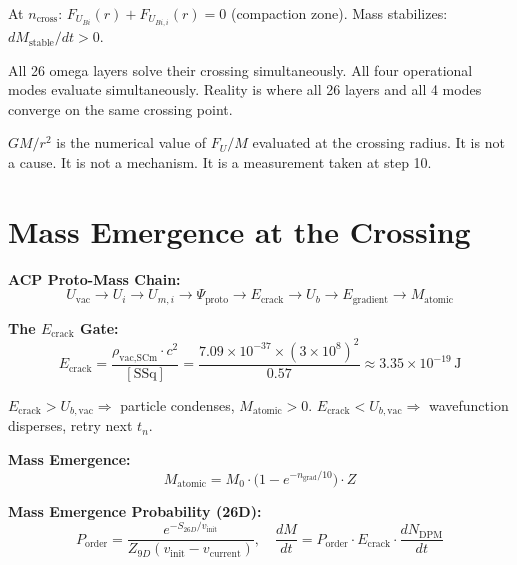 \documentclass[12pt,a4paper]{article}
\begin{document}
At $n_{\text{cross}}$: $F_{U_{Bi}}(r) + F_{U_{Bi,i}}(r) = 0$ (compaction zone).
Mass stabilizes: $dM_{\text{stable}}/dt > 0$.

All 26 omega layers solve their crossing simultaneously.
All four operational modes evaluate simultaneously.
Reality is where all 26 layers and all 4 modes converge on the same crossing point.

$GM/r^2$ is the numerical value of $F_U / M$ evaluated at the crossing radius.
It is not a cause.  It is not a mechanism.  It is a measurement taken at step 10.

\section{Mass Emergence at the Crossing}
\label{sec:mass}

\noindent\textbf{ACP Proto-Mass Chain:}
\begin{equation}
  U_{\text{vac}} \to U_i \to U_{m,i} \to \Psi_{\text{proto}}
  \to E_{\text{crack}} \to U_b \to E_{\text{gradient}} \to M_{\text{atomic}}
  \label{eq:acp_chain}
\end{equation}

\noindent\textbf{The $E_{\text{crack}}$ Gate:}
\begin{equation}
  E_{\text{crack}} = \frac{\rho_{\text{vac,SCm}} \cdot c^2}{[\text{SSq}]}
    = \frac{7.09\times10^{-37} \times (3\times10^8)^2}{0.57}
    \approx 3.35\times10^{-19}\,\text{J}
  \label{eq:ecrack}
\end{equation}

$E_{\text{crack}} > U_{b,\text{vac}} \Rightarrow$ particle condenses,
$M_{\text{atomic}} > 0$.
$E_{\text{crack}} < U_{b,\text{vac}} \Rightarrow$ wavefunction disperses,
retry next $t_n$.

\noindent\textbf{Mass Emergence:}
\begin{equation}
  M_{\text{atomic}} = M_0 \cdot \bigl(1 - e^{-n_{\text{grad}}/10}\bigr) \cdot Z
  \label{eq:mass_emergence}
\end{equation}

\noindent\textbf{Mass Emergence Probability (26D):}
\begin{equation}
  P_{\text{order}} = \frac{e^{-S_{26D}/v_{\text{init}}}}{Z_{9D}(v_{\text{init}}-v_{\text{current}})},
  \quad
  \frac{dM}{dt} = P_{\text{order}} \cdot E_{\text{crack}} \cdot \frac{dN_{\text{DPM}}}{dt}
  \label{eq:p_order}
\end{equation}
\end{document}
